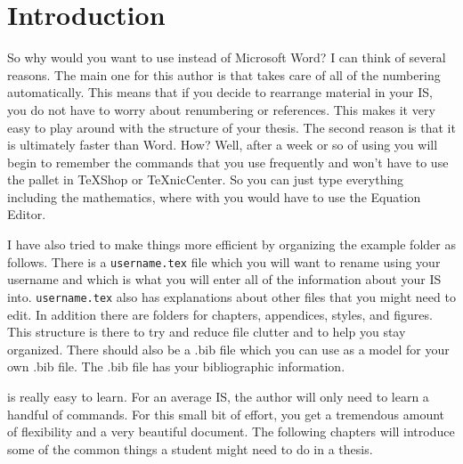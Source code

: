 \chapter{Introduction}\label{intro}
So why would you want to use \lt instead of Microsoft Word\texttrademark? I can think of several reasons. The main one for this author is that \lt takes care of all of the numbering automatically. This means that if you decide to rearrange material in your IS, you do not have to worry about renumbering or references. This makes it very easy to play around with the structure of your thesis. The second reason is that it is ultimately faster than Word\texttrademark. How? Well, after a week or so of using \lt you will begin to remember the commands that you use frequently and won't have to use the \lt pallet in TeXShop or TeXnicCenter. So you can just type everything including the mathematics, where with \msw you would have to use the Equation Editor.

I have also tried to make things more efficient by organizing the example folder as follows. There is a \texttt{username.tex} file which you will want to rename using your username and which is what you will enter all of the information about your IS into. \texttt{username.tex} also has explanations about other files that you might need to edit. In addition there are folders for chapters, appendices, styles, and figures. This structure is there to try and reduce file clutter and to help you stay organized. There should also be a .bib file which you can use as a model for your own .bib file. The .bib file has your bibliographic information.

\lt is really easy to learn. For an average IS, the author will only need to learn a handful of commands. For this small bit of effort, you get a tremendous amount of flexibility and a very beautiful document. The following chapters will introduce some of the common things a student might need to do in a thesis.